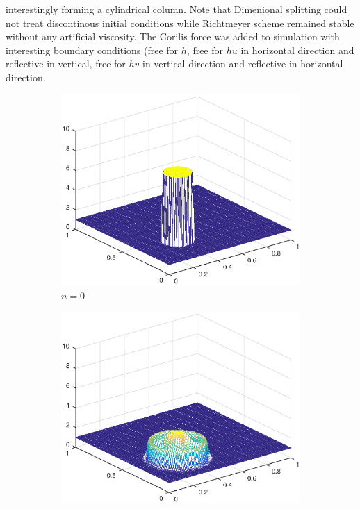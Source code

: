 interestingly forming a cylindrical column. Note that Dimenional splitting could not treat discontinous initial conditions while Richtmeyer scheme remained stable
without any artificial viscosity. The Corilis force was added to  simulation with interesting boundary conditions (free for $h$, free for $hu$ in horizontal direction and reflective in vertical,
free for $hv$ in vertical direction and reflective in horizontal direction. 
\begin{figure}[h!]
    \centering
    \begin{subfigure}[t]{0.4\textwidth}
        \centering
        \includegraphics[width=\textwidth]{images/sol_ri_0000_per.eps}
        \caption{$n=0$}
        \label{fig:0}
    \end{subfigure}
    \begin{subfigure}[t]{0.48\textwidth}
        \centering
        \includegraphics[width=\textwidth]{images/sol_ri_0025_per.eps}

\end{subfigure}
\end{figure}
